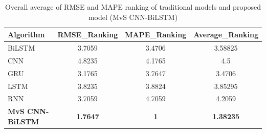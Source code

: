 \documentclass[a4paper,fleqn]{cas-sc}
\begin{document}
\begin{table}[!htp]
  \caption{Overall average of RMSE and MAPE ranking of traditional models and proposed model (MvS CNN-BiLSTM)}
  \centering
  \begin{tabular}{lccc}
  \hline
  Algorithm&RMSE\_Ranking&MAPE\_Ranking&Average\_Ranking\\\hline
  BiLSTM&3.7059&3.4706&3.58825\\
  CNN&4.8235&4.1765&4.5\\
  GRU&3.1765&3.7647&3.4706\\
  LSTM&3.8235&3.8824&3.85295\\
  RNN&3.7059&4.7059&4.2059\\
  \textbf{MvS CNN-BiLSTM}&\textbf{1.7647}&\textbf{1}&\textbf{1.38235} \\\hline
\end{tabular}
\label{AVG RANK}
  \end{table}
\end{document}
